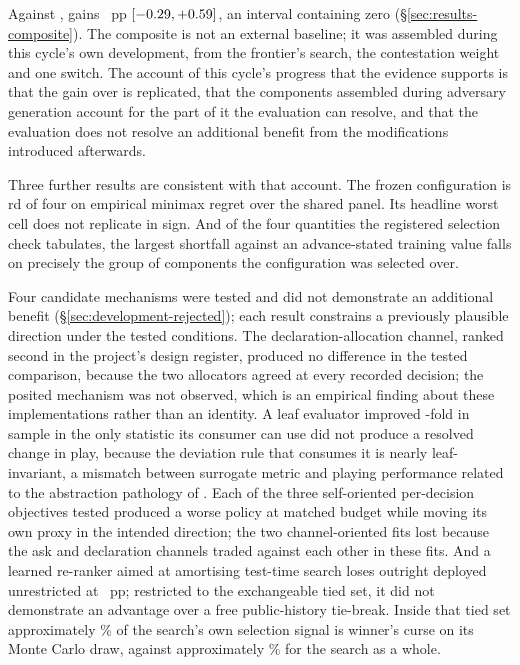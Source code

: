 Against \composite{}, \sestina{} gains \vsevenBtwoComposite{}~pp
$[-0.29, +0.59]$, an interval containing zero
(\S\ref{sec:results-composite}). The composite is not an external baseline; it was assembled during
this cycle's own development, from the \vsix{} frontier's search, the contestation weight and one
switch. The account of this cycle's progress that the evidence supports is that the gain over
\fcheap{} is replicated, that the components assembled during adversary generation account for the
part of it the evaluation can resolve, and that the evaluation does not resolve an additional
benefit from the modifications introduced afterwards.

Three further results are consistent with that account. The frozen configuration is
\vsevenRegretFrozenRank{}rd of four on empirical minimax regret over the shared panel. Its headline
worst cell does not replicate in sign. And of the four quantities the registered selection check
tabulates, the largest shortfall against an advance-stated training value falls on precisely the
group of components the configuration was selected over.

Four candidate mechanisms were tested and did not demonstrate an additional benefit
(\S\ref{sec:development-rejected}); each result constrains a previously plausible direction under
the tested conditions. The declaration-allocation channel, ranked second in the project's design
register, produced no difference in the tested comparison, because the two allocators agreed at
every recorded decision; the posited mechanism was not observed, which is an empirical finding about
these implementations rather than an identity. A leaf evaluator improved \vsevenKoneFold{}-fold in
sample in the only statistic its consumer can use did not produce a resolved change in play,
because the deviation rule that consumes it is nearly leaf-invariant, a mismatch between surrogate
metric and playing performance related to the abstraction pathology of \cite{waugh-abstraction}.
Each of the three self-oriented per-decision objectives tested produced a worse policy at matched
budget while moving its own proxy in the intended direction; the two channel-oriented fits lost
because the ask and declaration channels traded against each other in these fits. And a learned
re-ranker aimed at amortising test-time search loses outright deployed unrestricted at
\vsevenKfiveUnrestricted{}~pp; restricted to the exchangeable tied set, it did not demonstrate an
advantage over a free public-history tie-break. Inside that tied set approximately
\vsevenCurseTieShare\% of the search's own selection signal is winner's curse on its Monte Carlo
draw, against approximately \vsevenCurseShare\% for the search as a whole.

